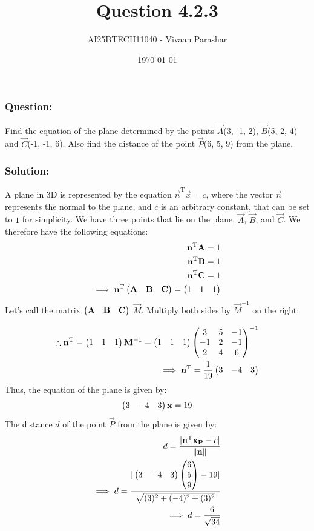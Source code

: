 \documentclass{beamer}
\title{Question 4.2.3}
\author{AI25BTECH11040 - Vivaan Parashar}
\date{\today}
\begin{document}
\frame{\titlepage}

\begin{frame}
    \frametitle{Question: }
    Find the equation of the plane determined by the points $\vec{A}$(3, -1, 2), $\vec{B}$(5, 2, 4) and $\vec{C}$(-1, -1, 6). Also find the distance of the point $\vec{P}$(6, 5, 9) from the plane.
\end{frame}

\begin{frame}
    \frametitle{Solution: }
    A plane in 3D is represented by the equation $\vec{n}^\mathrm{T}\vec{x} = c$, where the vector $\vec{n}$ represents the normal to the plane, and $c$ is an arbitrary constant, that can be set to $1$ for simplicity.
    We have three points that lie on the plane, $\vec{A}$, $\vec{B}$, and $\vec{C}$. We therefore have the following equations:
    \begin{align}
        \mathbf{n}^\mathrm{T}\mathbf{A} = 1                                                     \\
        \mathbf{n}^\mathrm{T}\mathbf{B} = 1                                                     \\
        \mathbf{n}^\mathrm{T}\mathbf{C} = 1                                                     \\
        \implies\mathbf{n}^\mathrm{T}\begin{pmatrix}\mathbf{A} & \mathbf{B} & \mathbf{C}\end{pmatrix} = \begin{pmatrix}1 & 1 & 1\end{pmatrix} \\
    \end{align}
    Let's call the matrix $\begin{pmatrix}\mathbf{A} & \mathbf{B} & \mathbf{C}\end{pmatrix}$ $\vec{M}$. Multiply both sides by $\vec{M}^\mathrm{-1}$ on the right:
\end{frame}
\begin{frame}
    \begin{align}
        \therefore \mathbf{n}^\mathrm{T} = \begin{pmatrix}1           & 1  & 1\end{pmatrix}\mathbf{M}^\mathrm{-1} = \begin{pmatrix}1 & 1 & 1\end{pmatrix}\begin{pmatrix}3 & 5 & -1 \\ -1 & 2 & -1 \\ 2 & 4 & 6\end{pmatrix}^\mathrm{-1}\\
        \implies \mathbf{n}^\mathrm{T} = \frac{1}{19}\begin{pmatrix}3 & -4 & 3\end{pmatrix}
    \end{align}
    Thus, the equation of the plane is given by:
    \begin{align}
        \begin{pmatrix}3 & -4 & 3\end{pmatrix}\mathbf{x} = 19
    \end{align}
    The distance $d$ of the point $\vec{P}$ from the plane is given by:
    \begin{align}
        d = \frac{|\mathbf{n}^\mathrm{T}\mathbf{x_P} - c|}{\|\mathbf{n}\|} \\
        \implies d = \frac{|\begin{pmatrix}3 & -4 & 3\end{pmatrix}\begin{pmatrix}6            \\ 5 \\ 9\end{pmatrix} - 19|}{\sqrt{(3)^2 + (-4)^2 + (3)^2}}\\
        \implies d = \frac{6}{\sqrt{34}}
    \end{align}
\end{frame}
\end{document}
